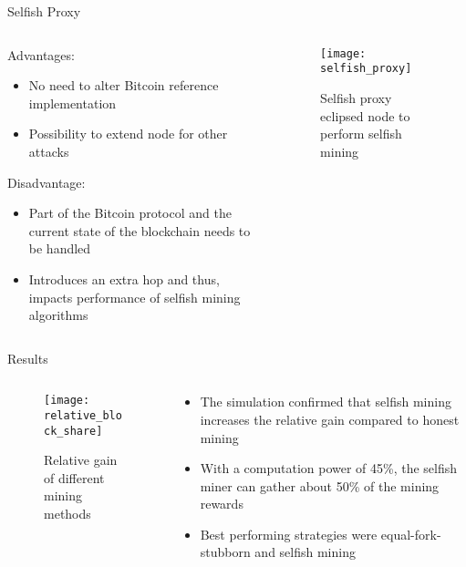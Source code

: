 \documentclass[final,hyperref={pdfpagelabels=true}]{beamer}
\begin{document}
\begin{frame}
\begin{block}{Selfish Proxy}
\begin{columns}[t]
\begin{column}{.45\textwidth}
     		\bigskip
     		Advantages:
     		\begin{itemize}
     			\item No need to alter Bitcoin reference implementation
     			\item Possibility to extend node for other attacks
			\end{itemize}
     		Disadvantage:
     		\begin{itemize}
     			\item Part of the Bitcoin protocol and the current state of the blockchain needs to be handled
     			\item Introduces an extra hop and thus, impacts performance of selfish mining algorithms
			\end{itemize}   			
    	\end{column}
 	
        \begin{column}{.45\textwidth}
        	\begin{figure}[t]
        	    \vspace*{-1cm}
            	\texttt{[image: selfish\_proxy]}
            	\centering
            	\caption{Selfish proxy eclipsed node to perform selfish mining}
        	\end{figure} 
    	\end{column}
    	
  	\end{columns}
  \end{block}

  \begin{columns}[t]

    \begin{column}{.55\textwidth}
      \begin{block}{Results}
		
		\begin{columns}[t]

    		\begin{column}{.45\textwidth}
        		\begin{figure}[t]
        			\vspace*{-1cm}
            		\texttt{[image: relative\_block\_share]}
            		\centering
            		\caption{Relative gain of different mining methods}
        		\end{figure}
    		\end{column}
    		\begin{column}{.45\textwidth}
				\begin{itemize}
					\item The simulation confirmed that selfish mining increases the relative gain compared to honest mining
					\item With a computation power of 45\%, the selfish miner can gather about 50\% of the mining rewards
					\item Best performing strategies were equal-fork-stubborn and selfish mining
				\end{itemize}
    		\end{column}
  		\end{columns}
  		

\end{block}
\end{column}
\end{columns}
\end{frame}
\end{document}
